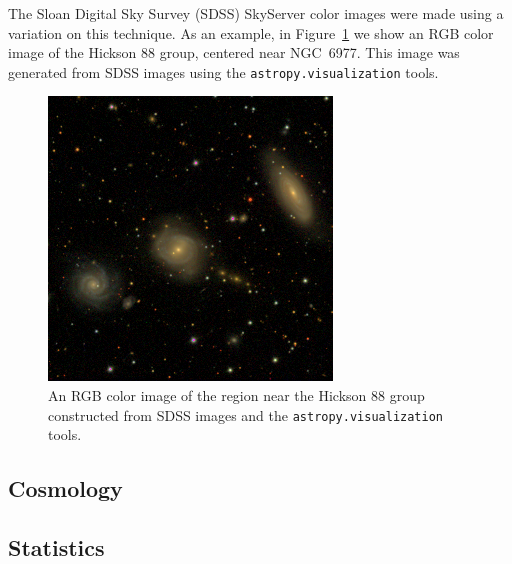 \documentclass[modern]{aastex61}
\newcommand{\package}[1]{\texttt{#1}\xspace}
\renewcommand{\figurename}{Figure\xspace}
\begin{document}
The Sloan Digital Sky Survey (SDSS) SkyServer color images were made using a variation on this technique.  As an example, in \figurename~\ref{fig:ngc6977} we show an RGB color image of the Hickson 88 group, centered near NGC~6977.  This image was generated from SDSS images using the \package{astropy.visualization} tools.

\begin{figure}
\includegraphics[width=\textwidth]{ngc6977.png}
\caption{An RGB color image of the region near the Hickson 88 group
constructed from SDSS images and the \package{astropy.visualization}
tools.
\label{fig:ngc6977}}
\end{figure}


\subsection{Cosmology}


\subsection{Statistics}
\end{document}
